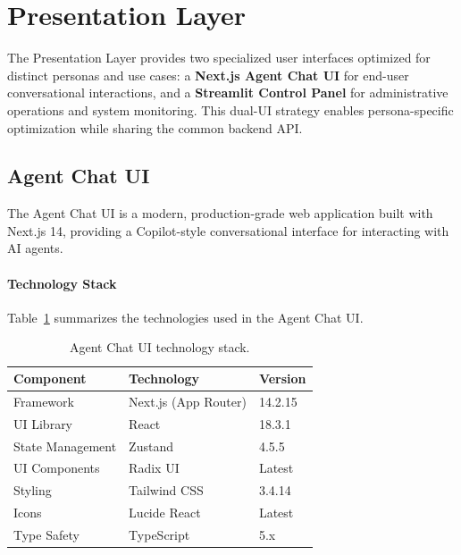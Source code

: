 
\section{Presentation Layer}
\label{sec:presentation-layer}

The Presentation Layer provides two specialized user interfaces optimized for distinct personas and use cases: a \textbf{Next.js Agent Chat UI} for end-user conversational interactions, and a \textbf{Streamlit Control Panel} for administrative operations and system monitoring. This dual-UI strategy enables persona-specific optimization while sharing the common backend API.

\subsection{Agent Chat UI}
\label{subsec:agent-chat-ui}

The Agent Chat UI is a modern, production-grade web application built with Next.js 14, providing a Copilot-style conversational interface for interacting with AI agents.

\paragraph{Technology Stack}
Table~\ref{tab:chat-ui-stack} summarizes the technologies used in the Agent Chat UI.

\begin{table}[htbp]
    \centering
    \caption{Agent Chat UI technology stack.}
    \label{tab:chat-ui-stack}
    \small
    \begin{tabular}{lll}
        \toprule
        \textbf{Component} & \textbf{Technology} & \textbf{Version} \\
        \midrule
        Framework & Next.js (App Router) & 14.2.15 \\
        UI Library & React & 18.3.1 \\
        State Management & Zustand & 4.5.5 \\
        UI Components & Radix UI & Latest \\
        Styling & Tailwind CSS & 3.4.14 \\
        Icons & Lucide React & Latest \\
        Type Safety & TypeScript & 5.x \\
        \bottomrule
    \end{tabular}
\end{table}

